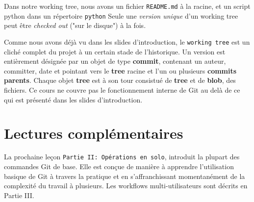\documentclass[a4paper]{../../common/tufte-latex/tufte-handout}
\begin{document}
Dans notre working tree, nous avons un fichier \texttt{README.md} à la racine, et un script python dans un répertoire \texttt{python}
Seule une \textit{version unique} d'un working tree peut être \textit{checked out} ("sur le disque") à la fois.

Comme nous avons déjà vu dans les slides d'introduction, le \texttt{working tree} est un cliché complet du projet à un certain stade de l'historique.
Un version est entièrement désignée par un objet de type \textbf{commit}, contenant un auteur, committer, date et pointant vers le \textbf{tree} racine et l'un ou plusieurs \textbf{commits parents}.
Chaque objet \textbf{tree} est à son tour consistué de \textbf{tree} et de \textbf{blob}, des fichiers.
Ce cours ne couvre pas le fonctionnement interne de Git au delà de ce qui est présenté dans les slides d'introduction.

\section{Lectures complémentaires}

La prochaine leçon \texttt{Partie II: Opérations en solo}, introduit la plupart des commandes Git de base. Elle est conçue de manière à apprendre l'utilisation basique de Git à travers la pratique et en s'affranchissant momentanément de la complexité du travail à plusieurs. Les workflows multi-utilisateurs sont décrits en Partie III.



\end{document}

